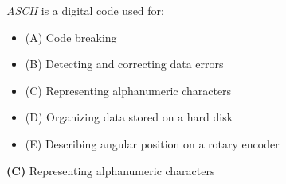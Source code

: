 

{\it ASCII} is a digital code used for:

\begin{itemize}
\item{(A)} Code breaking
\vskip 5pt 
\item{(B)} Detecting and correcting data errors
\vskip 5pt 
\item{(C)} Representing alphanumeric characters
\vskip 5pt 
\item{(D)} Organizing data stored on a hard disk
\vskip 5pt 
\item{(E)} Describing angular position on a rotary encoder
\end{itemize}







{\bf (C)} Representing alphanumeric characters
 










